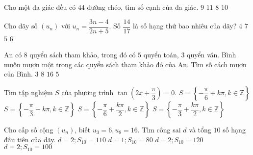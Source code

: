 \begin{ex}%
Cho một đa giác đều có $44$ đường chéo, tìm số cạnh của đa giác.	
\choice
{$9$}
{\True $11$}
{$8$}
{$10$}
\end{ex}
\begin{ex}%
Cho dãy số $\left(u_n\right)$ với $u_n=\dfrac{3n-4}{2n+5}$. Số $\dfrac{14}{17}$ là số hạng thứ bao nhiêu của dãy? 	
\choice
{$4$}
{$7$}
{$5$}
{\True $6$}
\end{ex}
\begin{ex}%
An có 8 quyển sách tham khảo, trong đó có $5$ quyển toán, $3$ quyển văn. Bình muốn mượn một trong các quyển sách tham khảo đó của An. Tìm số cách mượn của Bình.	
\choice
{$3$}
{\True $8$}
{$16$}
{$5$}
\end{ex}
\begin{ex}%
Tìm tập nghiệm $S$ của phương trình $\tan\left(2x+\dfrac{\pi}{3}\right)=0$.
\choice
{$S=\left\{-\dfrac{\pi }{6}+k\pi, k\in \mathbb{Z}\right\}$}
{$S=\left\{-\dfrac{\pi }{3}+k\pi, k\in \mathbb{Z}\right\}$}
{\True $S=\left\{-\dfrac{\pi }{6}+\dfrac{k\pi}{2}, k\in \mathbb{Z}\right\}$}
{$S=\left\{-\dfrac{\pi }{3}+\dfrac{k\pi}{2}, k\in \mathbb{Z}\right\}$}
\end{ex}
\begin{ex}%
Cho cấp số cộng $\left(u_n\right)$, biết $u_3=6, u_8=16$. Tìm công sai $d$ và tổng $10$ số hạng đầu tiên của dãy.	
\choice
{\True $d=2; S_{10}=110$}
{$d=1; S_{10}=80$}
{$d=2; S_{10}=120$}
{$d=2; S_{10}=100$}
\end{ex}
